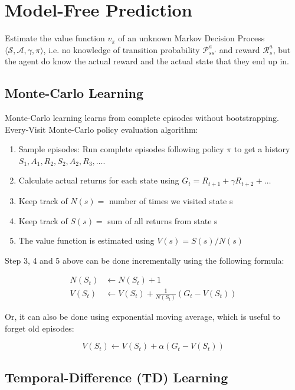 \section{Model-Free Prediction}

Estimate the value function $v_\pi$ of an unknown Markov Decision Process
$\langle \mathcal{S}, \mathcal{A}, \gamma, \pi \rangle$, i.e. no knowledge of
transition probability $\mathcal{P}_{ss\prime}^a$ and reward $\mathcal{R}_s^a$,
but the agent do know the actual reward and the actual state that they end up
in.

\subsection{Monte-Carlo Learning}

Monte-Carlo learning learns from complete episodes without bootstrapping. \\

\noindent Every-Visit Monte-Carlo policy evaluation algorithm:

\begin{enumerate}
    \item Sample episodes: Run complete episodes following policy $\pi$ to get a history
          $S_1, A_1, R_2, S_2, A_2, R_3, \ldots$.
    \item Calculate actual returns for each state using $G_t = R_{t+1} + \gamma R_{t+2} +
              \ldots$
    \item Keep track of $N(s) = $ number of times we visited state s
    \item Keep track of $S(s) = $ sum of all returns from state s
    \item The value function is estimated using $V(s) = S(s) / N(s)$
\end{enumerate}

\noindent Step 3, 4 and 5 above can be done incrementally using the following formula:

\begin{align*}
    N(S_t) & \leftarrow N(S_t) + 1                               \\
    V(S_t) & \leftarrow V(S_t) + \frac{1}{N(S_t)} (G_t - V(S_t))
\end{align*}

\noindent Or, it can also be done using exponential moving average, which is useful to forget old episodes:

\[
    V(S_t) \leftarrow V(S_t) + \alpha (G_t - V(S_t))
\]

\subsection{Temporal-Difference (TD) Learning}

